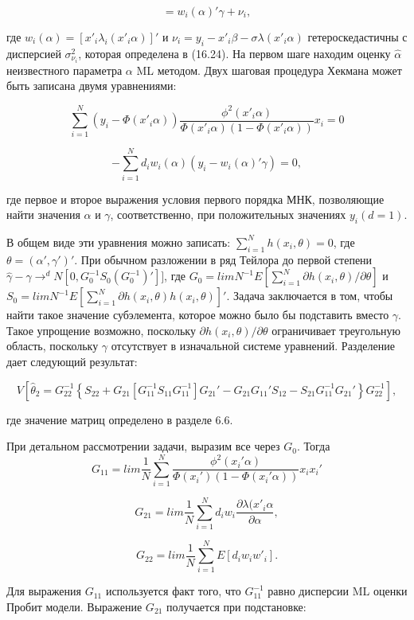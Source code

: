 \[
=w_i(\alpha)'\gamma+\nu_i,
\]

где $w_{i}(\alpha)={[{x'}_i\lambda_i({x'}_i\alpha)]}'$ и $\nu_i=y_i-{x'}_i\beta-\sigma\lambda({x'}_i\alpha)$ гетероскедастичны с дисперсией $\sigma^2_{\nu_i}$, которая определена в (16.24). На первом шаге находим оценку $\hat{\alpha}$ неизвестного параметра $\alpha$ ML методом. Двух шаговая процедура Хекмана может быть записана двумя уравнениями:

\begin{equation}
\sum_{i=1}^N(y_i-\Phi({x'}_i\alpha))
\frac{\phi^2({x'}_i\alpha)}{\Phi({x'}_i\alpha)(1-\Phi({x'}_i\alpha))}x_{i}=0
\end{equation}


\[
-\sum_{i=1}^N d_iw_i(\alpha)(y_i-w_i(\alpha)'\gamma) =0,
\]

где первое и второе выражения условия первого порядка МНК, позволяющие найти значения $\alpha$ и $\gamma$, соответственно, при положительных значениях $y_{i}(d=1)$.

В общем виде эти уравнения можно записать: $\sum_{i=1}^Nh(x_i,\theta)=0$, где $\theta=(\alpha',\gamma')'$. При обычном разложении в ряд Тейлора до первой степени $\hat{\gamma}-\gamma{\to}^dN[0,G^{-1}_0S_0(G^{-1}_0)']]$, где $G_0=limN^{-1}E[\sum_{i=1}^N\partial h(x_i,\theta)/\partial\theta]$ и $S_0=limN^{-1}E[\sum_{i=1}^N\partial h(x_i,\theta)h(x_i,\theta)]'$. Задача заключается в том, чтобы найти такое значение субэлемента, которое можно было бы подставить вместо $\gamma$. Такое упрощение возможно, поскольку $\partial h(x_i,\theta)/\partial\theta$ ограничивает треугольную область, поскольку $\gamma$ отсутствует в изначальной системе уравнений. Разделение дает следующий результат:

\[
V[\hat{\theta}_2=G_22^{-1}\left\lbrace S_22+G_21[G_11^{-1}S_11G_11^{-1}]G_21'-G_{21}G_{11}'S_{12}-S_{21}G_{11}^{-1}G_{21}'\right\rbrace{G_{22}^{-1}}],
\]

где значение матриц определено в разделе 6.6.

При детальном рассмотрении задачи, выразим все через $G_0$. Тогда
\[
G_{11}=lim\dfrac{1}{N}\sum_{i=1}^N \dfrac{\phi^2(x_i'\alpha)}{\Phi(x_i')(1-\Phi(x_i'\alpha))}x_ix_i'
\]

\[
G_{21}=lim\dfrac{1}{N}\sum_{i=1}^N d_iw_i\dfrac{\partial\lambda(x'_{i}\alpha}{\partial\alpha},
\]

\[
G_{22}=lim\dfrac{1}{N}\sum_{i=1}^N E[d_{i}w_iw'_i].
\]

Для выражения $G_11$ используется факт того, что $G^{-1}_{11}$ равно дисперсии ML оценки Пробит модели. Выражение $G_{21}$ получается при подстановке: 


